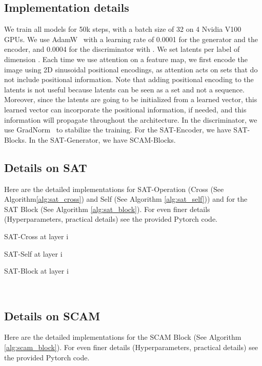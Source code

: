 \documentclass[runningheads]{llncs}
\begin{document}
\subsection{Implementation details}
We train all models for 50k steps, with a batch size of 32 on 4 Nvidia V100 GPUs. We use AdamW~\cite{loshchilov2017decoupled} with a learning rate of 0.0001 for the generator and the encoder, and 0.0004 for the discriminator with . 
We set  latents per label of dimension .
Each time we use attention on a feature map, we first encode the image using 2D sinusoidal positional encodings, as attention acts on sets that do not include positional information. Note that adding positional encoding to the latents is not useful because latents can be seen as a set and not a sequence. Moreover, since the latents are going to be initialized from a learned vector, this learned vector can incorporate the positional information, if needed, and this information will propagate throughout the architecture.
In the discriminator, we use GradNorm~\cite{wu2021gradient} to stabilize the training. For the SAT-Encoder, we have  SAT-Blocks. In the SAT-Generator, we have  SCAM-Blocks.

\subsection{Details on SAT}
Here are the detailed implementations for SAT-Operation (Cross (See Algorithm\ref{alg:sat_cross}) and Self (See Algorithm \ref{alg:sat_self})) and for the SAT Block (See Algorithm \ref{alg:sat_block}). For even finer details (Hyperparameters, practical details) see the provided Pytorch code.


\begin{algorithm}
\caption{SAT-Cross at layer i}\label{alg:sat_cross}
\KwData{;;}
\KwResult{}
\;
\;
\;
\;
\end{algorithm}

\begin{algorithm}
\caption{SAT-Self at layer i}\label{alg:sat_self}
\KwData{;}
\KwResult{}
\;
\;
\;
\;
\end{algorithm}

\begin{algorithm}
\caption{SAT-Block at layer i}\label{alg:sat_block}
\KwData{;;}
\KwResult{; }
\;
\;
\;
\;
\;
 \
\end{algorithm}

\subsection{Details on SCAM}
Here are the detailed implementations for the SCAM Block (See Algorithm \ref{alg:scam_block}). For even finer details (Hyperparameters, practical details) see the provided Pytorch code.
\end{document}
